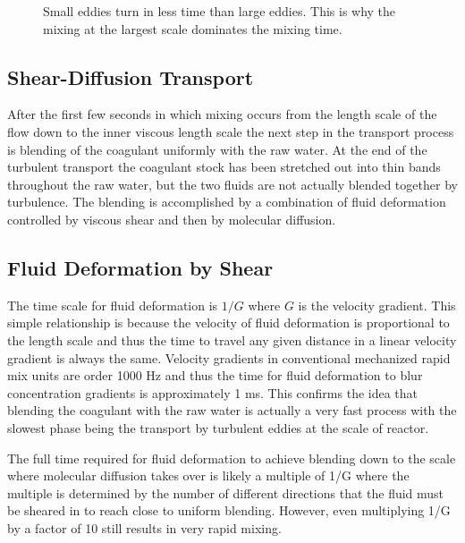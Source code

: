 \documentclass[letterpaper,10pt,english]{sphinxmanual}
\let\sphinxpxdimen\pdfpxdimen\else\newdimen\sphinxpxdimen
\begin{document}
\begin{figure}[htbp]
\centering
\capstart

\noindent\sphinxincludegraphics[width=400\sphinxpxdimen]{{Eddy_turnover_time}.png}
\caption{Small eddies turn in less time than large eddies. This is why the mixing at the largest scale dominates the mixing time.}\label{\detokenize{Rapid_Mix/RM_Derivations:id4}}\label{\detokenize{Rapid_Mix/RM_Derivations:figure-eddy-turnover-time}}\end{figure}


\subsection{Shear-Diffusion Transport}
\label{\detokenize{Rapid_Mix/RM_Derivations:shear-diffusion-transport}}\label{\detokenize{Rapid_Mix/RM_Derivations:heading-shear-diffusion-transport}}
After the first few seconds in which mixing occurs from the length scale of the flow down to the inner viscous length scale the next step in the transport process is blending of the coagulant uniformly with the raw water. At the end of the turbulent transport the coagulant stock has been stretched out into thin bands throughout the raw water, but the two fluids are not actually blended together by turbulence. The blending is accomplished by a combination of fluid deformation controlled by viscous shear and then by molecular diffusion.


\subsection{Fluid Deformation by Shear}
\label{\detokenize{Rapid_Mix/RM_Derivations:fluid-deformation-by-shear}}\label{\detokenize{Rapid_Mix/RM_Derivations:heading-fluid-deformation-by-shear}}
The time scale for fluid deformation is \(1/G\) where \(G\) is the velocity gradient. This simple relationship is because the velocity of fluid deformation is proportional to the length scale and thus the time to travel any given distance in a linear velocity gradient is always the same. Velocity gradients in conventional mechanized rapid mix units are order 1000 Hz and thus the time for fluid deformation to blur concentration gradients is approximately 1 ms. This confirms the idea that blending the coagulant with the raw water is actually a very fast process with the slowest phase being the transport by turbulent eddies at the scale of reactor.

The full time required for fluid deformation to achieve blending down to the scale where molecular diffusion takes over is likely a multiple of 1/G where the multiple is determined by the number of different directions that the fluid must be sheared in to reach close to uniform blending. However, even multiplying 1/G by a factor of 10 still results in very rapid mixing.
\end{document}
